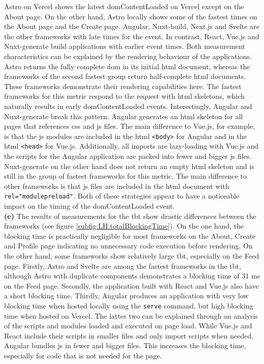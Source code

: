 \documentclass[a4paper, 12pt]{article}
\begin{document}
Astro on Vercel shows the latest domContentLoaded on Vercel except on the About page.
On the other hand, Astro locally shows some of the fastest times on the About page and the Create page.
Angular, Nuxt-build, Next.js and Svelte are the other frameworks with late times for the event.
In contrast, React, Vue.js and Nuxt-generate build applications with earlier event times.
Both measurement characteristics can be explained by the rendering behaviour of the applications.
Astro returns the fully complete \acrshort{dom} in its initial \acrshort{html} document, whereas the frameworks of the second fastest group return half-complete \acrshort{html} documents.
These frameworks demonstrate their rendering capabilities here.
The fastest frameworks for this metric respond to the request with \acrshort{html} skeletons, which naturally results in early domContentLoaded events.
Interestingly, Angular and Nuxt-generate break this pattern.
Angular generates an \acrshort{html} skeleton for all pages that references \acrshort{css} and \acrshort{js} files.
The main difference to Vue.js, for example, is that the \acrshort{js} modules are included in the \acrshort{html} \verb|<body>| for Angular and in the \acrshort{html} \verb|<head>| for Vue.js.
Additionally, all imports are lazy-loading with Vue.js and the scripts for the Angular application are packed into fewer and bigger \acrshort{js} files.
Nuxt-generate on the other hand does not return an empty \acrshort{html} skeleton and is still in the group of fastest frameworks for this metric.
The main difference to other frameworks is that \acrshort{js} files are included in the \acrshort{html} document with \verb|rel="modulepreload"|.
Both of these strategies appear to have a noticeable impact on the timing of the domContentLoaded event.
\\

\textbf{(e)} The results of measurements for the \acrlong{tbt} show drastic differences between the frameworks (see figure \ref{subfig:LH:totalBlockingTime}).
On the one hand, the blocking time is practically negligible for most frameworks on the About, Create and Profile page indicating no unnecessary code execution before rendering.
On the other hand, some frameworks show relatively large \acrshort{tbt}, especially on the Feed page.
Firstly, Astro and Svelte are among the fastest frameworks in the \acrshort{tbt}, although Astro with duplicate components demonstrates a blocking time of 31 ms on the Feed page.
Secondly, the application built with React and Vue.js also have a short blocking time.
Thirdly, Angular produces an application with very low blocking time when hosted locally using the \verb|serve| command, but high blocking time when hosted on Vercel.
The latter two can be explained through an analysis of the scripts and modules loaded and executed on page load.
While Vue.js and React include their scripts in smaller files and only import scripts when needed, Angular bundles \acrlong{js} in fewer and bigger files.
This increases the blocking time, especially for code that is not needed for the page.
\end{document}
